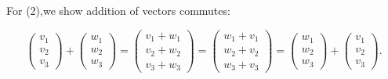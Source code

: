 \begin {example}{}
For (2),we show addition of vectors commutes:

\[ \left(\begin{array}{c}v_1\\v_2\\v_3\end{array}\right) + \left(\begin{array}{c}w_1\\w_2\\w_3\end{array}\right) = \left(\begin{array}{c}v_1+w_1\\v_2+w_2\\v_3+w_3\end{array}\right) 
 =  \left(\begin{array}{c}w_1+v_1\\w_2+v_2\\w_3+v_3\end{array}\right) = \left(\begin{array}{c}w_1\\w_2\\w_3\end{array}\right) +\left(\begin{array}{c}v_1\\v_2\\v_3\end{array}\right).\]


\end{example}
